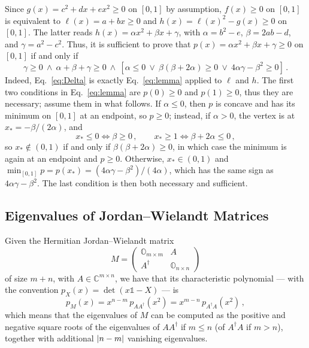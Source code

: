 \begin{subappendices}
Since $g(x)=c^2 + dx + ex^2 \ge 0$ on $[0,1]$ by assumption, $f(x) \ge 0$ on $[0,1]$ is equivalent to $\ell(x) = a + bx \ge 0$ and $h(x) = \ell(x)^2 -g(x) \ge 0$ on $[0,1]$. The latter reads $h(x) = \alpha x^2 + \beta x + \gamma$, with $\alpha = b^2-e$, $\beta = 2ab-d$, and $\gamma=a^2-c^2$.
Thus, it is sufficient to prove that $p(x) = \alpha x^2+\beta x + \gamma \ge 0$ on $[0,1]$ if and only if
    \begin{equation}\label{eq:lemma}
        \gamma\ge0 \ \land \ \alpha+\beta+\gamma\ge0 \ \land \
    [\alpha\le0 \ \lor \ \beta(\beta+2\alpha)\ge0 \ \lor \ 4\alpha\gamma-\beta^2\ge0 ] \,.
    \end{equation}
Indeed, Eq.~\eqref{eq:Delta} is exactly Eq.~\eqref{eq:lemma} applied to $\ell$ and $h$.
The first two conditions in Eq.~\eqref{eq:lemma} are $p(0)\ge 0$ and $p(1)\ge 0$, thus they are necessary; assume them in what follows. If $\alpha \le 0$, then $p$ is concave and has its minimum on $[0,1]$ at an endpoint, so $p\ge 0$; instead, if $\alpha >0$, the vertex is at $x_\ast = -\beta/(2\alpha)$, and
\begin{equation}
    x_\ast\le0 \iff \beta\ge0 \,, \qquad x_\ast\ge1 \iff \beta+2\alpha\le0 \,,
\end{equation}
so $x_\ast \notin (0,1)$ if and only if $\beta(\beta+2\alpha)\ge 0$, in which case the minimum is again at an endpoint and $p\ge 0$. Otherwise, $x_\ast \in (0,1)$ and $\min_{[0,1]} p = p(x_\ast) = (4\alpha\gamma-\beta^2)/(4\alpha)$, which has the same sign as $4\alpha\gamma-\beta^2$. The last condition is then both necessary and sufficient. 

\subsection{Eigenvalues of Jordan--Wielandt Matrices}

Given the Hermitian Jordan--Wielandt matrix
\begin{equation}
    M=\begin{pmatrix}
        \mathbb{O}_{m\times m} & A \\ A^\dagger & \mathbb{O}_{n\times n}
    \end{pmatrix}
\end{equation}
of size $m+n$,
with $A\in \mathbb{C}^{m \times n}$,
we have that its characteristic polynomial --- with the convention $p_X(x) = \det(x\mathbb{1}-X)$ --- is
\begin{equation}
    p_M(x)=x^{n-m}\,p_{AA^\dagger}(x^2) = x^{m-n}\,p_{A^\dagger A}(x^2) \,,
\end{equation}
which means that the eigenvalues of $M$ can be computed as the positive and negative square roots of the eigenvalues of $AA^\dagger$ if $m\le n$ (of $A^\dagger A$ if $m > n$), together with additional $\abs{n-m}$ vanishing eigenvalues. 
%


\end{subappendices}
